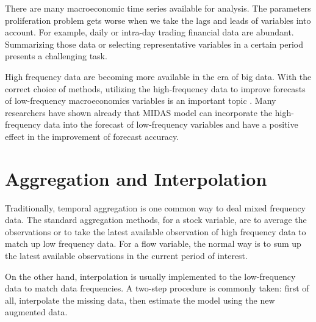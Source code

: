 


There are many macroeconomic time series available for analysis. The parameters proliferation problem gets worse when we take the lags and leads of variables into account. For example, daily or intra-day trading financial data are abundant. Summarizing those data or selecting representative variables in a certain period presents a challenging task.  




High frequency data are becoming more available in the era of big data. With the correct choice of methods, utilizing the high-frequency data to improve forecasts of low-frequency macroeconomics variables is an important topic \cite{Ghysels2007} . Many researchers have shown already that MIDAS model can incorporate the high-frequency data into the forecast of low-frequency variables and have a positive effect in the improvement of forecast accuracy.



\section{Aggregation and Interpolation}



Traditionally, temporal aggregation is one common way to deal mixed frequency data. The standard aggregation methods, for a stock variable, are to average the observations or to take the latest available observation of high frequency data to match up low frequency data. For a flow variable, the normal way is to sum up the latest available observations in the current period of interest.


On the other hand,  interpolation is usually  implemented to the low-frequency data to match data frequencies. A two-step procedure is commonly taken: first of all, interpolate the missing data, then estimate the model using the new augmented data. 


